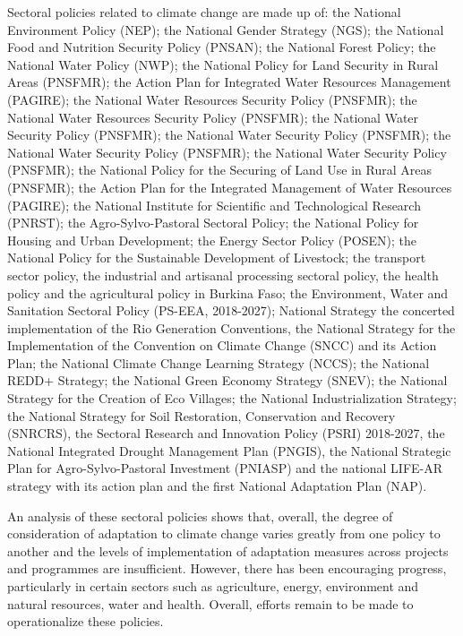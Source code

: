 \documentclass[
]{book}
\begin{document}
Sectoral policies related to climate change are made up of: the National Environment Policy (NEP); the National Gender Strategy (NGS); the National Food and Nutrition Security Policy (PNSAN); the National Forest Policy; the National Water Policy (NWP); the National Policy for Land Security in Rural Areas (PNSFMR); the Action Plan for Integrated Water Resources Management (PAGIRE); the National Water Resources Security Policy (PNSFMR); the National Water Resources Security Policy (PNSFMR); the National Water Security Policy (PNSFMR); the National Water Security Policy (PNSFMR); the National Water Security Policy (PNSFMR); the National Water Security Policy (PNSFMR); the National Policy for the Securing of Land Use in Rural Areas (PNSFMR); the Action Plan for the Integrated Management of Water Resources (PAGIRE); the National Institute for Scientific and Technological Research (PNRST); the Agro-Sylvo-Pastoral Sectoral Policy; the National Policy for Housing and Urban Development; the Energy Sector Policy (POSEN); the National Policy for the Sustainable Development of Livestock; the transport sector policy, the industrial and artisanal processing sectoral policy, the health policy and the agricultural policy in Burkina Faso; the Environment, Water and Sanitation Sectoral Policy (PS-EEA, 2018-2027); National Strategy the concerted implementation of the Rio Generation Conventions, the National Strategy for the Implementation of the Convention on Climate Change (SNCC) and its Action Plan; the National Climate Change Learning Strategy (NCCS); the National REDD+ Strategy; the National Green Economy Strategy (SNEV); the National Strategy for the Creation of Eco Villages; the National Industrialization Strategy; the National Strategy for Soil Restoration, Conservation and Recovery (SNRCRS), the Sectoral Research and Innovation Policy (PSRI) 2018-2027, the National Integrated Drought Management Plan (PNGIS), the National Strategic Plan for Agro-Sylvo-Pastoral Investment (PNIASP) and the national LIFE-AR strategy with its action plan and the first National Adaptation Plan (NAP).

An analysis of these sectoral policies shows that, overall, the degree of consideration of adaptation to climate change varies greatly from one policy to another and the levels of implementation of adaptation measures across projects and programmes are insufficient. However, there has been encouraging progress, particularly in certain sectors such as agriculture, energy, environment and natural resources, water and health. Overall, efforts remain to be made to operationalize these policies.
\end{document}

